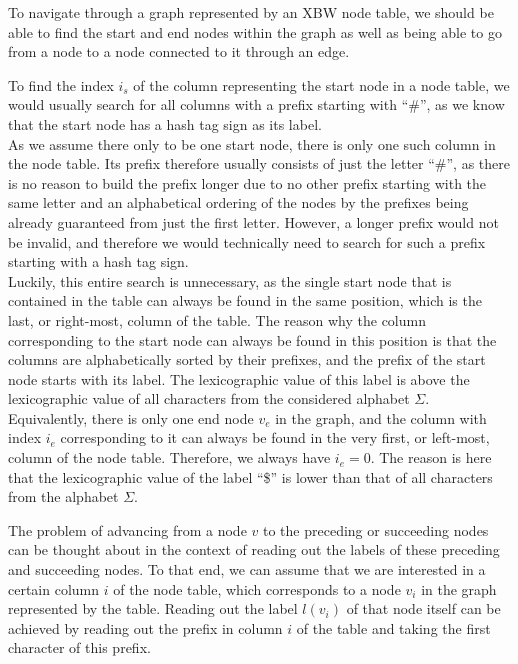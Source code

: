 \documentclass[a4paper,12pt,twoside,BCOR=10mm]{scrbook}
\begin{document}
To navigate through a graph represented by an XBW node table,
we should be able to find the start and end nodes within the graph
as well as being able to go from a node to a node connected to it through an edge.

To find the index $ i_s $ of the column representing the start node in a node table,
we would usually search for all columns with a prefix starting with “$\#$”,
as we know that the start node has a hash tag sign as its label. \\
As we assume there only to be one start node, there is only one such column in the node table.
Its prefix therefore usually consists of just the letter “$\#$”, as there is no reason
to build the prefix longer due to no other prefix starting with the same letter and an alphabetical
ordering of the nodes by the prefixes being already guaranteed from just the first letter.
However, a longer prefix would not be invalid, and therefore we would technically need to
search for such a prefix starting with a hash tag sign. \\
Luckily, this entire search is unnecessary, as the single start node that is contained in the
table can always be found in the same position, which is the last, or right-most, column of the table.
The reason why the column corresponding to the start node can always be found in this position is that
the columns are alphabetically sorted by their prefixes, and the prefix of the start node starts with its label.
The lexicographic value of this label is above the lexicographic value of all characters from the
considered alphabet $ \Sigma $. \\
Equivalently, there is only one end node $ v_e $ in the graph, and the column with index $ i_e $ corresponding to it
can always be found in the very first, or left-most, column of the node table.
Therefore, we always have $ i_e = 0 $.
The reason is here that the lexicographic value of the label “\$” is lower than that of all characters from the
alphabet $ \Sigma $.

The problem of advancing from a node $ v $ to the preceding or succeeding nodes can
be thought about in the context of reading out the labels of these preceding and succeeding nodes.
To that end, we can assume that we are interested in a certain column $ i $ of the node table,
which corresponds to a node $ v_i $ in the graph represented by the table.
Reading out the label $ l ( v_i ) $ of that node itself can be achieved by reading out the prefix
in column $ i $ of the table and taking the first character of this prefix.
\end{document}
